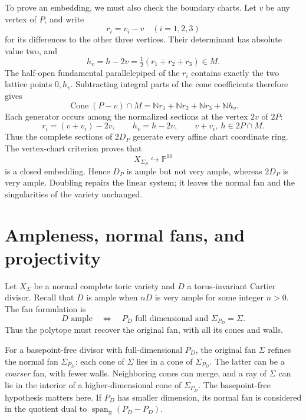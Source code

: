 \documentclass[11pt]{article}
\theoremstyle{definition}
\theoremstyle{remark}
\DeclareMathOperator{\Cone}{Cone}
\newcommand{\Sg}{\Sigma}
\newcommand{\bP}{\mathbb{P}}
\newcommand{\bR}{\mathbb{R}}
\newcommand{\bN}{\mathbb{N}}
\begin{document}
To prove an embedding, we must also check the boundary charts.
Let \(v\) be any vertex of \(P\), and write
\[
    r_i=v_i-v\quad(i=1,2,3)
\]
for its differences to the other three vertices. Their determinant
has absolute value two, and
\[
    h_v=h-2v=\tfrac12(r_1+r_2+r_3)\in M.
\]
The half-open fundamental parallelepiped of the \(r_i\) contains
exactly the two lattice points \(0,h_v\). Subtracting integral
parts of the cone coefficients therefore gives
\[
    \Cone(P-v)\cap M
      =\bN r_1+\bN r_2+\bN r_3+\bN h_v.
\]
Each generator occurs among the normalized sections at the vertex
\(2v\) of \(2P\):
\[
    r_i=(v+v_i)-2v,\qquad h_v=h-2v,
    \qquad v+v_i,\ h\in2P\cap M.
\]
Thus the complete sections of \(2D_P\) generate every affine chart
coordinate ring. The vertex-chart criterion proves that
\[
    X_{\Sigma_P}\hookrightarrow\bP^{10}
\]
is a closed embedding. Hence \(D_P\) is ample but not very ample,
whereas \(2D_P\) is very ample. Doubling repairs the linear system;
it leaves the normal fan and the singularities of the variety unchanged.

\section{Ampleness, normal fans, and projectivity}

Let \(X_\Sg\) be a normal complete toric variety and \(D\) a
torus-invariant Cartier divisor. Recall that \(D\) is ample when
\(nD\) is very ample for some integer \(n>0\). The fan formulation is
\[
    \boxed{D\text{ ample}
       \quad\Longleftrightarrow\quad
       P_D\text{ full dimensional and }\Sigma_{P_D}=\Sg.}
\]
Thus the polytope must recover the original fan, with all its cones
and walls.

For a basepoint-free divisor with full-dimensional \(P_D\), the
original fan \(\Sg\) refines the normal fan \(\Sigma_{P_D}\):
each cone of \(\Sg\) lies in a cone of \(\Sigma_{P_D}\).
The latter can be a \emph{coarser} fan, with fewer walls. Neighboring
cones can merge, and a ray of \(\Sg\) can lie in the interior of a
higher-dimensional cone of \(\Sigma_{P_D}\). The basepoint-free
hypothesis matters here. If \(P_D\) has smaller dimension, its normal
fan is considered in the quotient dual to
\(\operatorname{span}_{\bR}(P_D-P_D)\).
\end{document}

